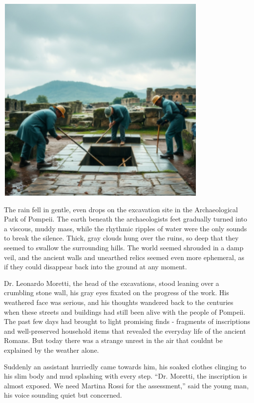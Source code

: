 \documentclass[
]{article}
\begin{document}
\includegraphics[width=4.11458in,height=4.09375in]{media/image002.png}

The rain fell in gentle, even drops on the excavation site in the
Archaeological Park of Pompeii. The earth beneath the
archaeologists\textquotesingle{} feet gradually turned into a viscous,
muddy mass, while the rhythmic ripples of water were the only sounds to
break the silence. Thick, gray clouds hung over the ruins, so deep that
they seemed to swallow the surrounding hills. The world seemed shrouded
in a damp veil, and the ancient walls and unearthed relics seemed even
more ephemeral, as if they could disappear back into the ground at any
moment.

Dr. Leonardo Moretti, the head of the excavations, stood leaning over a
crumbling stone wall, his gray eyes fixated on the progress of the work.
His weathered face was serious, and his thoughts wandered back to the
centuries when these streets and buildings had still been alive with the
people of Pompeii. The past few days had brought to light promising
finds - fragments of inscriptions and well-preserved household items
that revealed the everyday life of the ancient Romans. But today there
was a strange unrest in the air that couldn\textquotesingle t be
explained by the weather alone.

Suddenly an assistant hurriedly came towards him, his soaked clothes
clinging to his slim body and mud splashing with every step. ``Dr.
Moretti, the inscription is almost exposed. We need Martina Rossi for
the assessment,'' said the young man, his voice sounding quiet but
concerned.
\end{document}
